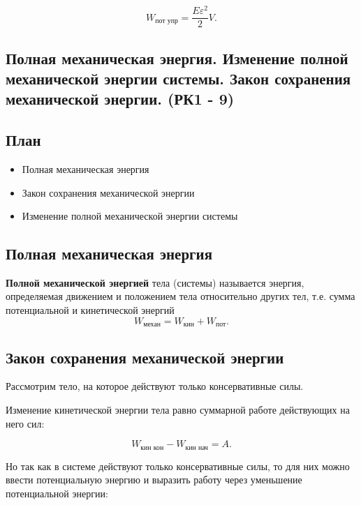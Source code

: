 \documentclass[a4paper,12pt]{article}
\begin{document}
\[
W_{\text{пот упр}} = \frac{E\varepsilon^2}{2} V.
\]

\subsection{Полная механическая энергия. Изменение полной механической энергии системы. Закон сохранения механической энергии. (РК1 - 9)}

\subsection*{План}
\begin{itemize}
\item Полная механическая энергия
\item Закон сохранения механической энергии
\item Изменение полной механической энергии системы
\end{itemize}

\vspace{0.8em}

\subsection*{Полная механическая энергия}

\begin{definitionbox}
\textbf{Полной механической энергией} тела (системы) называется энергия, определяемая движением и положением тела относительно других тел, т.е. сумма потенциальной и кинетической энергий
\[
W_{\text{механ}} = W_{\text{кин}} + W_{\text{пот}}.
\]
\end{definitionbox}

\vspace{0.8em}

\subsection*{Закон сохранения механической энергии}

Рассмотрим тело, на которое действуют только консервативные силы.

Изменение кинетической энергии тела равно суммарной работе действующих на него сил:

\[
W_{\text{кин кон}} - W_{\text{кин нач}} = A.
\]

Но так как в системе действуют только консервативные силы, то для них можно ввести потенциальную энергию и выразить работу через уменьшение потенциальной энергии:
\end{document}
